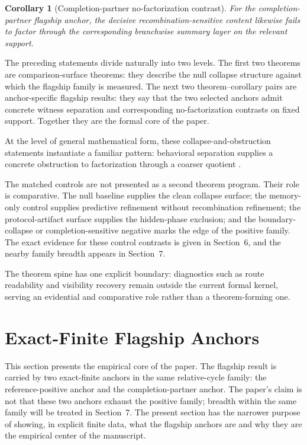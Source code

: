 \documentclass[11pt]{article}
\newtheorem{corollary}[theorem]{Corollary}
\theoremstyle{definition}
\begin{document}
\begin{corollary}[Completion-partner no-factorization contrast]
\label{cor:completion-partner-no-factorization}
For the completion-partner flagship anchor, the decisive recombination-sensitive content likewise fails to factor through the corresponding branchwise summary layer on the relevant support.
\end{corollary}

The preceding statements divide naturally into two levels. The first two theorems are comparison-surface theorems: they describe the null collapse structure against which the flagship family is measured. The next two theorem--corollary pairs are anchor-specific flagship results: they say that the two selected anchors admit concrete witness separation and corresponding no-factorization contrasts on fixed support. Together they are the formal core of the paper.

At the level of general mathematical form, these collapse-and-obstruction statements instantiate a familiar pattern: behavioral separation supplies a concrete obstruction to factorization through a coarser quotient \cite{Nerode1958,LarsenSkou1991,BurrisSankappanavar1981}.

The matched controls are not presented as a second theorem program. Their role is comparative. The null baseline supplies the clean collapse surface; the memory-only control supplies predictive refinement without recombination refinement; the protocol-artifact surface supplies the hidden-phase exclusion; and the boundary-collapse or completion-sensitive negative marks the edge of the positive family. The exact evidence for these control contrasts is given in Section~6, and the nearby family breadth appears in Section~7.

The theorem spine has one explicit boundary: diagnostics such as route readability and visibility recovery remain outside the current formal kernel, serving an evidential and comparative role rather than a theorem-forming one.

\section{Exact-Finite Flagship Anchors}

This section presents the empirical core of the paper. The flagship result is carried by two exact-finite anchors in the same relative-cycle family: the reference-positive anchor and the completion-partner anchor. The paper's claim is not that these two anchors exhaust the positive family; breadth within the same family will be treated in Section~7. The present section has the narrower purpose of showing, in explicit finite data, what the flagship anchors are and why they are the empirical center of the manuscript.
\end{document}
